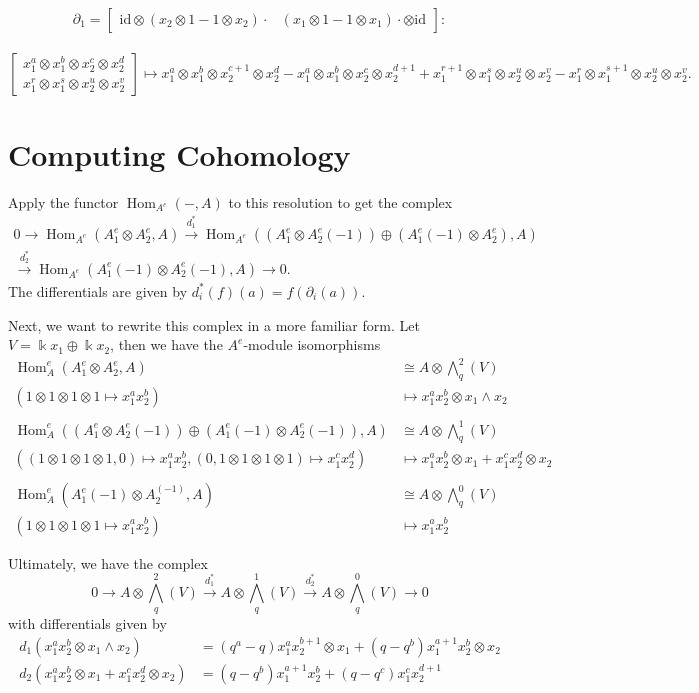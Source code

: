 \documentclass[12pt,a4paper]{article}
\DeclareMathOperator{\Hom}{Hom}
\newcommand{\Wedge}{\textstyle\bigwedge}
\newcommand{\kk}{\Bbbk}
\newcommand\1{_{(1)}}
\newcommand\2{_{(2)}}
\begin{document}
\newpage
\[\partial_1=\begin{bmatrix}\text{id}\otimes(x_2\otimes 1-1\otimes x_2)\cdot&(x_1\otimes 1-1\otimes x_1)\cdot\otimes\text{id}\end{bmatrix}:\]\\
\[\begin{bmatrix}x_1^a\otimes x_1^b\otimes x_2^c\otimes x_2^d\\x_1^r\otimes x_1^s\otimes x_2^u\otimes x_2^v\end{bmatrix}\mapsto x_1^a\otimes x_1^b\otimes x_2^{c+1}\otimes x_2^d-x_1^a\otimes x_1^b\otimes x_2^c\otimes x_2^{d+1}
+ x_1^{r+1}\otimes x_1^s\otimes x_2^u\otimes x_2^v-x_1^r\otimes x_1^{s+1}\otimes x_2^u\otimes x_2^v.
\]

\section{Computing Cohomology}
Apply the functor $\Hom_{A^e}(-,A)$ to this resolution to get the complex
\begin{align*}
0\to \Hom_{A^e}(A_1^e\otimes A_2^e,A)\xrightarrow{d_1^*} \Hom_{A^e}(\left(A_1^e\otimes A_2^e(-1)\right)\oplus\left(A_1^e(-1)\otimes A_2^e\right),A)\\\xrightarrow{d_2^*}\Hom_{A^e}(A_1^e(-1)\otimes A_2^e(-1),A)\to 0.  
\end{align*}
The differentials are given by $d_i^*(f)(a)=f(\partial_i(a))$.

Next, we want to rewrite this complex in a more familiar form.
Let $V=\kk x_1\oplus \kk x_2$, then we have the $A^e$-module isomorphisms
\begin{align*}
\Hom_A^e(A_1^e\otimes A_2^e,A)&\cong A\otimes \Wedge_q^2(V)\\
(1\otimes 1\otimes 1\otimes 1\mapsto x_1^ax_2^b)&\mapsto x_1^ax_2^b\otimes x_1\wedge x_2\\
\\
\Hom_A^e(\left(A^e_1\otimes A_2^e(-1)\right)\oplus\left(A_1^e(-1)\otimes A_2^e(-1)\right),A)&\cong A\otimes\Wedge_q^1(V)\\
((1\otimes 1\otimes 1\otimes 1,0)\mapsto x_1^ax_2^b,(0,1\otimes 1\otimes 1\otimes 1)\mapsto x_1^cx_2^d)&\mapsto x_1^ax_2^b\otimes x_1+x_1^cx_2^d\otimes x_2\\
\\
\Hom_A^e(A_1^e(-1)\otimes A_2^(-1),A)&\cong A\otimes\Wedge_q^0(V)\\
(1\otimes 1\otimes 1\otimes 1\mapsto x_1^ax_2^b)&\mapsto x_1^ax_2^b
\end{align*}

Ultimately, we have the complex
\[
0 \to A\otimes \Wedge_q^2(V)\xrightarrow{d_1^*}A\otimes \Wedge_q^1(V)\xrightarrow{d_2^*}A\otimes \Wedge_q^0(V)\to 0
\]
with differentials given by
\begin{align*}
d_1(x_1^ax_2^b\otimes x_1\wedge x_2)&=(q^{a}-q)x_1^ax_2^{b+1}\otimes x_1+(q-q^{b})x_1^{a+1}x_2^b\otimes x_2\\
d_2(x_1^ax_2^b\otimes x_1+x_1^cx_2^d\otimes x_2)&=(q-q^{b})x_1^{a+1}x_2^b+(q-q^{c})x_1^cx_2^{d+1}
\end{align*}
\end{document}
